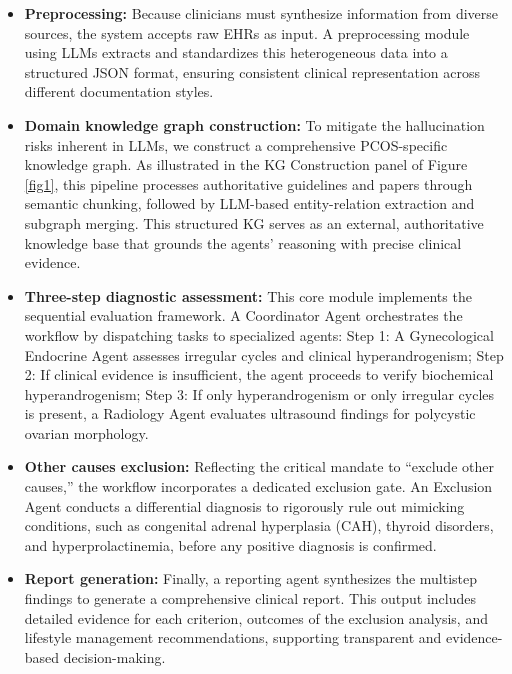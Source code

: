 \documentclass[a4paper,fleqn]{cas-dc}
\begin{document}
\begin{itemize}
    \item [\textbullet] \textbf{Preprocessing:} Because clinicians must synthesize information from diverse sources, the system accepts raw EHRs as input. A preprocessing module using LLMs extracts and standardizes this heterogeneous data into a structured JSON format, ensuring consistent clinical representation across different documentation styles.
    
    \item [\textbullet] \textbf{Domain knowledge graph construction:} To mitigate the hallucination risks inherent in LLMs, we construct a comprehensive PCOS-specific knowledge graph. As illustrated in the KG Construction panel of Figure \ref{fig1}, this pipeline processes authoritative guidelines and papers through semantic chunking, followed by LLM-based entity-relation extraction and subgraph merging. This structured KG serves as an external, authoritative knowledge base that grounds the agents’ reasoning with precise clinical evidence.
 
    \item [\textbullet] \textbf{Three-step diagnostic assessment:} This core module implements the sequential evaluation framework. A Coordinator Agent orchestrates the workflow by dispatching tasks to specialized agents: Step 1: A Gynecological Endocrine Agent assesses irregular cycles and clinical hyperandrogenism; Step 2: If clinical evidence is insufficient, the agent proceeds to verify biochemical hyperandrogenism; Step 3: If only hyperandrogenism or only irregular cycles is present, a Radiology Agent evaluates ultrasound findings for polycystic ovarian morphology.
    
    \item [\textbullet] \textbf{Other causes exclusion:} Reflecting the critical mandate to ``exclude other causes,'' the workflow incorporates a dedicated exclusion gate. An Exclusion Agent conducts a differential diagnosis to rigorously rule out mimicking conditions, such as congenital adrenal hyperplasia (CAH), thyroid disorders, and hyperprolactinemia, before any positive diagnosis is confirmed.

    \item [\textbullet] \textbf{Report generation:} Finally, a reporting agent synthesizes the multistep findings to generate a comprehensive clinical report. This output includes detailed evidence for each criterion, outcomes of the exclusion analysis, and lifestyle management recommendations, supporting transparent and evidence-based decision-making.
\end{itemize}
    
\end{document}
